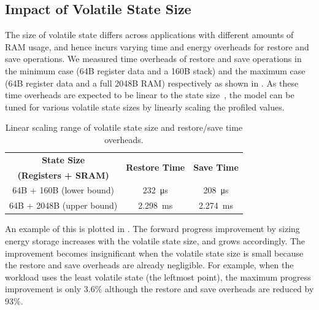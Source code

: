 \subsection{Impact of Volatile State Size}

The size of volatile state differs across applications with different amounts of RAM usage, and hence incurs varying time and energy overheads for restore and save operations. 
We measured time overheads of restore and save operations in the minimum case (64B register data and a 160B stack) and the maximum case (64B register data and a full 2048B RAM) respectively as shown in . 
As these time overheads are expected to be linear to the state size~\cite{sliper2019efficient}, the model can be tuned for various volatile state sizes by linearly scaling the profiled values. 

\begin{table}
    \renewcommand{\arraystretch}{1.2}
    \centering
    \begin{tabular}{|c|cc|}
        \hline
        \textbf{State Size} & \multirow{2}{*}{\textbf{Restore Time}} & \multirow{2}{*}{\textbf{Save Time}}\\
        \textbf{(Registers + SRAM)} & & \\
        \hline
        64B + 160B (lower bound) & \SI{232}{\micro\second} & \SI{208}{\micro\second}\\
        64B + 2048B (upper bound) & \SI{2.298}{\milli\second} & \SI{2.274}{\milli\second} \\
        \hline
    \end{tabular}
    \caption{Linear scaling range of volatile state size and restore/save time overheads.}
    \label{tab:ramscale}
\end{table}

An example of this is plotted in . 
The forward progress improvement by sizing energy storage increases with the volatile state size, and  grows accordingly. 
The improvement becomes insignificant when the volatile state size is small because the restore and save overheads are already negligible. 
For example, when the workload uses the least volatile state (the leftmost point), the maximum progress improvement is only 3.6\% although the restore and save overheads are reduced by 93\%. 

